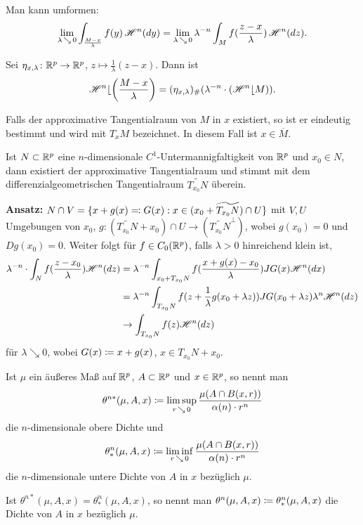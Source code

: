 \documentclass[a4paper,twoside,DIV15,BCOR12mm]{scrbook}
\newcommand{\HM}{\H}
\DeclareMathOperator{\downto}{\searrow}
\newcommand{\MR}{\lfloor}
\begin{document}
\begin{bemerkungen}
\item Man kann umformen:
\[
\lim_{\lambda \downto0} \int_{\frac{M-x}\lambda} f(y)\, \HM^n(dy) =  \lim_{\lambda\downto0} \lambda^{-n}\int_M f(\frac{z-x}\lambda)\,\HM^n(dz).
\]
\item Sei $\eta_{x,\lambda}\colon\mathbb{R}^p\to\mathbb{R}^p$, $z\mapsto \frac 1\lambda(z-x)$. Dann ist \[
\HM^n\MR \left( \frac{M-x}{\lambda} \right) = (\eta_{x,\lambda})_\# (\lambda^{-n} \cdot (\HM^n\MR M)).
\]
\item Falls der approximative Tangentialraum von $M$ in $x$ existiert, so ist er eindeutig bestimmt und wird mit $T_xM$ bezeichnet. In diesem Fall ist $x\in\overline M$.
\item Ist $N\subset \mathbb{R}^p$ eine $n$-dimensionale $C^1$-Untermannigfaltigkeit von $\mathbb{R}^p$ und $x_0 \in N$, dann existiert der approximative Tangentialraum und stimmt mit dem differenzialgeometrischen Tangentialraum $\widetilde {T_{x_0}N}$ überein.

\textbf{Ansatz:} $N\cap V = \{x + g(x) \ad G(x) : x\in (x_0 + \widetilde{T_{x_0}N}) \cap U\}$ mit $V,U$ Umgebungen von $x_0$, $g:(\widetilde{T_{x_0}N} + x_0) \cap U \to (\widetilde{T_{x_0}N}^\bot)$, wobei $g(x_0)=0$ und \(Dg(x_0)=0\). Weiter folgt für \(f \in C_0(\mathbb{R}^p)\), falls \(\lambda>0\) hinreichend klein ist,
\begin{align*}
\lambda^{-n} \cdot \int_N f(\frac{z-x_0}{\lambda}) \HM^n(dz) &= \lambda^{-n} \int_{x_0+T_{x_0}N} f(\frac{x+g(x)-x_0}\lambda) JG(x) \HM^n(dx) \\
&= \lambda^{-n} \int_{T_{x_0}N} f(z+\frac1\lambda g(x_0+\lambda z)) JG(x_0+\lambda z) \lambda^n \HM^n(dz) \\
&\to \int_{T_{x_0}N} f(z) \HM^n(dz)
\end{align*}
für  $ \lambda \downto 0$, 
wobei \(G(x) \da x+g(x)\), \(x\in T_{x_0}N + x_0\).
\end{bemerkungen}

\begin{definition}
Ist \(\mu\) ein äußeres Maß auf \(\mathbb{R}^p\), \(A \subset \mathbb{R}^p\) und \(x \in \mathbb{R}^p\), so nennt man 
\[
\theta^{n*}(\mu,A,x) \da \limsup_{r\downto0} \frac{\mu(A\cap B(x,r))}{\alpha(n)\cdot r^n}
\]
die \(n\)-dimensionale obere Dichte und
\[
\theta^n_*(\mu,A,x) \da \liminf_{r\downto0} \frac{\mu(A\cap B(x,r))}{\alpha(n)\cdot r^n}
\]
die \(n\)-dimensionale untere Dichte von \(A\) in \(x\) bezüglich \(\mu\).
\par
Ist \(\theta^{n*}(\mu,A,x) = \theta^n_*(\mu,A,x)\), so nennt man \(\theta^n(\mu,A,x) \da \theta^n_*(\mu,A,x)\) die Dichte von \(A\) in \(x\) bezüglich \(\mu\).
\end{definition}
\end{document}

